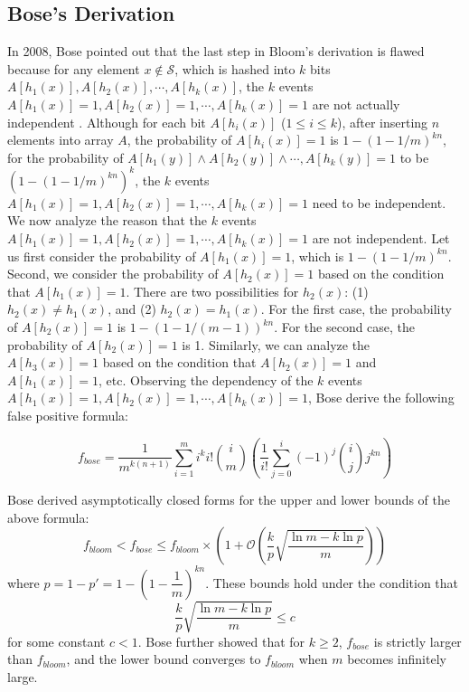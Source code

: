 \subsection{Bose's Derivation} \postsub
%
In 2008, Bose \etal pointed out that the last step in Bloom's derivation is flawed because for any element $x \notin \mathcal{S}$, which is hashed into $k$ bits $A[h_1(x)], A[h_2(x)], \cdots, A[h_k(x)]$, the $k$ events $A[h_1(x)]=1, A[h_2(x)]=1, \cdots, A[h_k(x)]=1$ are not actually independent \cite{bose2008false}.
%
Although for each bit $A[h_i(x)]$ ($1 \leqslant i \leqslant k$), after inserting $n$ elements into array $A$, the probability of $A[h_i(x)]=1$ is $1-(1-1/m)^{kn}$, for the probability of $A[h_1(y)] \wedge A[h_2(y)] \wedge \cdots, A[h_{k}(y)]=1$ to be $(1-(1-1/m)^{kn})^k$, the $k$ events $A[h_1(x)]=1, A[h_2(x)]=1, \cdots, A[h_k(x)]=1$ need to be independent.
%
We now analyze the reason that the $k$ events $A[h_1(x)]=1, A[h_2(x)]=1, \cdots, A[h_k(x)]=1$ are not independent.
%
Let us first consider the probability of $A[h_1(x)]=1$, which is $1-(1-1/m)^{kn}$.
%
Second, we consider the probability of $A[h_2(x)]=1$ based on the condition that $A[h_1(x)]=1$.
%
There are two possibilities for $h_2(x)$: (1) $h_2(x) \neq h_1(x)$, and (2) $h_2(x) = h_1(x)$.
%
For the first case, the probability of $A[h_2(x)]=1$ is $1-(1-1/(m-1))^{kn}$.
%
For the second case, the probability of $A[h_2(x)]=1$ is 1.
%
Similarly, we can analyze the $A[h_3(x)]=1$ based on the condition that $A[h_2(x)]=1$ and $A[h_1(x)]=1$, etc.
%
Observing the dependency of the $k$ events $A[h_1(x)]=1, A[h_2(x)]=1, \cdots, A[h_k(x)]=1$, Bose \etal derive the following false positive formula:

\begin{equation}
\label{fBose}
f_{bose}=\dfrac{1}{m^{k(n+1)}}  \sum\limits_{i=1}^{m}i^k i! \binom{i}{m}  \left(\dfrac{1}{i!} \sum\limits_{j=0}^{i} (-1)^j \binom{i}{j}j^{kn}\right)
\end{equation}

Bose \etal derived asymptotically closed forms for the upper and lower bounds of the above formula:
%
\begin{equation}
\label{fBound}
f_{bloom} < f_{bose} \leqslant f_{bloom} \times \left(1 + \mathcal{O}\left(\frac{k}{p} \sqrt{\frac{\ln m - k\ln p}{m}}\right)\right)
\end{equation}
where $p = 1 - p'=1-\left(1-\dfrac{1}{m}\right)^{kn}$.
%
These bounds hold under the condition that
\begin{equation}
\label{boundCon}
\frac{k}{p} \sqrt{\frac{\ln m - k\ln p}{m}} \leqslant c
\end{equation}
for some constant $c < 1$.
%
Bose \etal further showed that for $k \geqslant 2$, $f_{bose}$ is strictly larger than $f_{bloom}$, and the lower bound converges to $f_{bloom}$ when $m$ becomes infinitely large.

